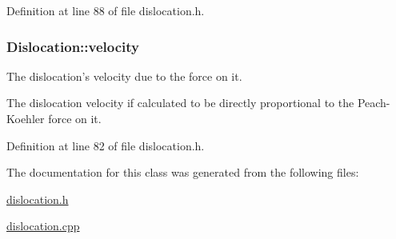Definition at line 88 of file dislocation.\-h.

\hypertarget{classDislocation_ad6f4e8e94b2525c2e58a77b9d2916c0e}{
\subsubsection[{velocity}]{ Dislocation\-::velocity\hspace{0.3cm}{\ttfamily [protected]}}}\label{d3/dc6/classDislocation_ad6f4e8e94b2525c2e58a77b9d2916c0e}


The dislocation's velocity due to the force on it. 

The dislocation velocity if calculated to be directly proportional to the Peach-\/\-Koehler force on it. 

Definition at line 82 of file dislocation.\-h.



The documentation for this class was generated from the following files\-:\begin{DoxyCompactItemize}
\item 
\hyperlink{dislocation_8h}{dislocation.\-h}\item 
\hyperlink{dislocation_8cpp}{dislocation.\-cpp}\end{DoxyCompactItemize}
